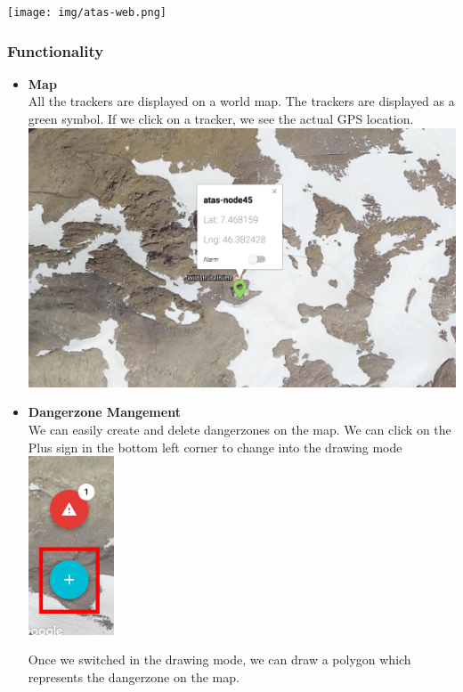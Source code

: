 \documentclass[a4paper,11pt, oneside]{report}
\theoremstyle{definition}
\begin{document}
\texttt{[image: img/atas-web.png]}

\newpage
\subsubsection{Functionality}

\begin{itemize}
\item \textbf{Map}\\ 
All the trackers are displayed on a world map. The trackers are displayed as a green symbol. If we click on a tracker, we see the actual GPS location.\\[0.3cm]
\includegraphics[width=\textwidth]{img/atas-web-map.png}

\item \textbf{Dangerzone Mangement} \\
We can easily create and delete dangerzones on the map. We can click on the Plus sign in the bottom left corner to change into the drawing mode\\[0.3cm]
\includegraphics[width=0.2\textwidth]{img/atas-web-adddangerzone.png}

\newpage
Once we switched in the drawing mode, we can draw a polygon which represents the dangerzone on the map.\\[0.3cm]


\end{itemize}
\end{document}
